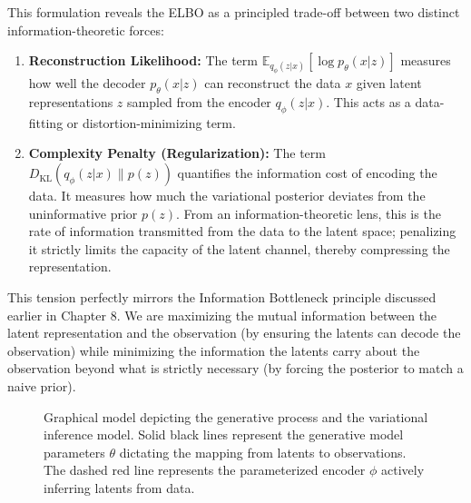 This formulation reveals the ELBO as a principled trade-off between two distinct information-theoretic forces:
\begin{enumerate}
    \item \textbf{Reconstruction Likelihood:} The term $\mathbb{E}_{q_\phi(z|x)}[ \log p_\theta(x|z) ]$ measures how well the decoder $p_\theta(x|z)$ can reconstruct the data $x$ given latent representations $z$ sampled from the encoder $q_\phi(z|x)$. This acts as a data-fitting or distortion-minimizing term.
    \item \textbf{Complexity Penalty (Regularization):} The term $D_{\mathrm{KL}}(q_\phi(z|x) \parallel p(z))$ quantifies the information cost of encoding the data. It measures how much the variational posterior deviates from the uninformative prior $p(z)$. From an information-theoretic lens, this is the rate of information transmitted from the data to the latent space; penalizing it strictly limits the capacity of the latent channel, thereby compressing the representation.
\end{enumerate}

This tension perfectly mirrors the Information Bottleneck principle discussed earlier in Chapter 8. We are maximizing the mutual information between the latent representation and the observation (by ensuring the latents can decode the observation) while minimizing the information the latents carry about the observation beyond what is strictly necessary (by forcing the posterior to match a naive prior).

\begin{figure}[htbp]
\centering
{}
\caption{Graphical model depicting the generative process and the variational inference model. Solid black lines represent the generative model parameters $\theta$ dictating the mapping from latents to observations. The dashed red line represents the parameterized encoder $\phi$ actively inferring latents from data.}
\label{fig:elbo_graphical}
\end{figure}

